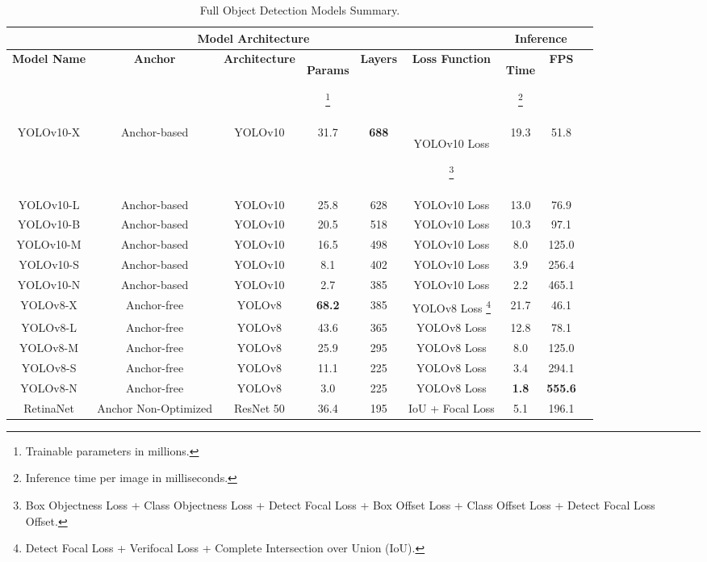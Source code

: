 \begin{table*}[h]
\centering
\caption{Full Object Detection Models Summary.}
\label{fig:modelsummary}
\begin{tabular}{|c|c|c|c|c|c|c|c|c|}
\hline
\multicolumn{6}{|c|}{\textbf{Model Architecture}} & \multicolumn{2}{c|}{\textbf{Inference}} \\
\hline
\textbf{Model Name} & \textbf{Anchor} & \textbf{Architecture} & \textbf{Params}\begin{scriptsize}\footnote{Trainable parameters in millions.}\end{scriptsize} & \textbf{Layers} & \textbf{Loss Function} & \textbf{Time} \begin{scriptsize}\footnote{Inference time per image in milliseconds.}\end{scriptsize} & \textbf{FPS} \\
\hline
YOLOv10-X & Anchor-based & YOLOv10 & 31.7 & \textbf{688} & YOLOv10 Loss\begin{scriptsize}\footnote{Box Objectness Loss + Class Objectness Loss + Detect Focal Loss + Box Offset Loss + Class Offset Loss + Detect Focal Loss Offset.}\end{scriptsize}  & 19.3 & 51.8  \\ 
YOLOv10-L & Anchor-based & YOLOv10 & 25.8 & 628 & YOLOv10 Loss & 13.0 & 76.9  \\ 
YOLOv10-B & Anchor-based & YOLOv10 & 20.5 & 518 & YOLOv10 Loss & 10.3 & 97.1  \\ 
YOLOv10-M & Anchor-based & YOLOv10 & 16.5 & 498 & YOLOv10 Loss & 8.0 & 125.0  \\ 
YOLOv10-S & Anchor-based & YOLOv10 & 8.1 & 402 & YOLOv10 Loss & 3.9 & 256.4  \\ 
YOLOv10-N & Anchor-based & YOLOv10 & 2.7 & 385 & YOLOv10 Loss & 2.2 & 465.1  \\ 
YOLOv8-X & Anchor-free & YOLOv8 & \textbf{68.2} & 385 & YOLOv8 Loss \footnote{Detect Focal Loss + Verifocal Loss + Complete Intersection over Union (IoU).} & 21.7 & 46.1  \\ 
YOLOv8-L & Anchor-free & YOLOv8 & 43.6 & 365 & YOLOv8 Loss & 12.8 & 78.1  \\ 
YOLOv8-M & Anchor-free & YOLOv8 & 25.9 & 295 & YOLOv8 Loss & 8.0 & 125.0  \\ 
YOLOv8-S & Anchor-free & YOLOv8 & 11.1 & 225 & YOLOv8 Loss & 3.4 & 294.1  \\ 
YOLOv8-N & Anchor-free & YOLOv8 & 3.0 & 225 & YOLOv8 Loss & \textbf{1.8} & \textbf{555.6}  \\ 
RetinaNet & Anchor Non-Optimized & ResNet 50 & 36.4 & 195 & IoU + Focal Loss & 5.1 & 196.1  \\ 

\end{tabular}
\end{table*}
